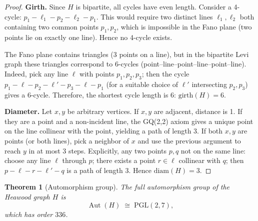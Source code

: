 \documentclass[12pt,a4paper,openany]{book}
\newtheorem{theorem}{Theorem}[section]
\begin{document}
\begin{proof}
\textbf{Girth.}  
Since $H$ is bipartite, all cycles have even length. Consider a 4-cycle: $p_1-\ell_1-p_2-\ell_2-p_1$. This would require two distinct lines $\ell_1,\ell_2$ both containing two common points $p_1,p_2$, which is impossible in the Fano plane (two points lie on exactly one line). Hence no 4-cycle exists.  

The Fano plane contains triangles (3 points on a line), but in the bipartite Levi graph these triangles correspond to 6-cycles (point–line–point–line–point–line). Indeed, pick any line $\ell$ with points $p_1,p_2,p_3$; then the cycle $p_1-\ell-p_2-\ell'-p_3-\ell-p_1$ (for a suitable choice of $\ell'$ intersecting $p_2,p_3$) gives a 6-cycle. Therefore, the shortest cycle length is 6: $\mathrm{girth}(H)=6$.

\textbf{Diameter.}  
Let $x,y$ be arbitrary vertices. If $x,y$ are adjacent, distance is 1. If they are a point and a non-incident line, the GQ(2,2) axiom gives a unique point on the line collinear with the point, yielding a path of length 3. If both $x,y$ are points (or both lines), pick a neighbor of $x$ and use the previous argument to reach $y$ in at most 3 steps. Explicitly, any two points $p,q$ not on the same line: choose any line $\ell$ through $p$; there exists a point $r\in \ell$ collinear with $q$; then $p-\ell-r-\ell'-q$ is a path of length 3. Hence $\mathrm{diam}(H)=3$.
\end{proof}

\begin{theorem}[Automorphism group]
The full automorphism group of the Heawood graph $H$ is
\[
\operatorname{Aut}(H)\;\cong\;\mathrm{PGL}(2,7),
\]
which has order $336$.
\end{theorem}
\end{document}
